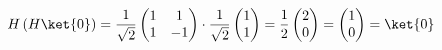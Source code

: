 \begin{examplebox}
\begin{enumerate}
\begin{equation*}
            H\left(H\ket{0}\right) =
            \dfrac{1}{\sqrt{2}}
            \begin{pmatrix}
                1 & 1 \\
                1 & -1
            \end{pmatrix}
            \cdot
            \dfrac{1}{\sqrt{2}}
            \begin{pmatrix}
                1 \\
                1
            \end{pmatrix}
            =
            \dfrac{1}{2}
            \begin{pmatrix}
                2 \\
                0
            \end{pmatrix}
            =
            \begin{pmatrix}
                1 \\
                0
            \end{pmatrix}
            =
            \ket{0}
        \end{equation*}
    \end{enumerate}
\end{examplebox}
